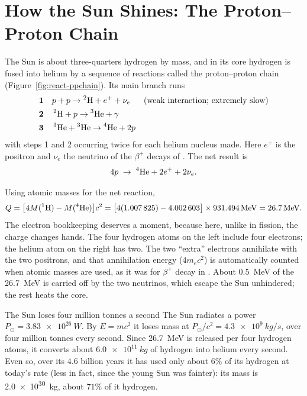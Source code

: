 \section{How the Sun Shines: The Proton--Proton Chain}\label{sec:react-sun}

The Sun is about three-quarters hydrogen by mass, and in its core hydrogen is fused into helium by a sequence of
reactions called the proton--proton chain (Figure~\ref{fig:react-ppchain}). Its main branch runs
\begin{align*}
&\textbf{1}\quad p+p\to\prescript{2}{}{\mathrm{H}}+e^++\nu_e &&\text{(weak interaction; extremely slow)}\\
&\textbf{2}\quad \prescript{2}{}{\mathrm{H}}+p\to\prescript{3}{}{\mathrm{He}}+\gamma\\
&\textbf{3}\quad \prescript{3}{}{\mathrm{He}}+\prescript{3}{}{\mathrm{He}}\to\prescript{4}{}{\mathrm{He}}+2p
\end{align*}
with steps 1 and 2 occurring twice for each helium nucleus made. Here $e^+$ is the positron and $\nu_e$ the
neutrino of the $\beta^+$ decays of . The net result is
\[
4p\;\to\;\prescript{4}{}{\mathrm{He}}+2e^++2\nu_e .
\]

\begin{figure}[htbp]\centering
{}
\end{figure}

Using atomic masses for the net reaction,
\[
Q=\big[4M(\iso{1}{H})-M(\iso{4}{He})\big]c^2=\big[4(\num{1.007825})-\num{4.002603}\big]\times\SI{931.494}{\MeV}=\SI{26.7}{\MeV}.
\]
The electron bookkeeping deserves a moment, because here, unlike in fission, the charge changes hands. The
four hydrogen atoms on the left include four electrons; the helium atom on the right has two. The two
``extra'' electrons annihilate with the two positrons, and that annihilation energy ($4m_ec^2$) is
automatically counted when atomic masses are used, as it was for $\beta^+$ decay in .
About \SI{0.5}{\MeV} of the \SI{26.7}{\MeV} is carried off by the two neutrinos, which escape the Sun
unhindered; the rest heats the core.

\begin{remarkbox}{The Sun loses four million tonnes a second}
The Sun radiates a power $P_\odot=\SI{3.83e26}{W}$. By $E=mc^2$ it loses mass at
$P_\odot/c^2=\SI{4.3e9}{kg/s}$, over four million tonnes every second. Since \SI{26.7}{\MeV} is released per
four hydrogen atoms, it converts about $\SI{6.0e11}{kg}$ of hydrogen into helium every second. Even so,
over its $4.6$ billion years it has used only about $6\%$ of its hydrogen at today's rate (less in fact,
since the young Sun was fainter): its mass is \SI{2.0e30}{kg}, about $71\%$ of it hydrogen.
\end{remarkbox}

